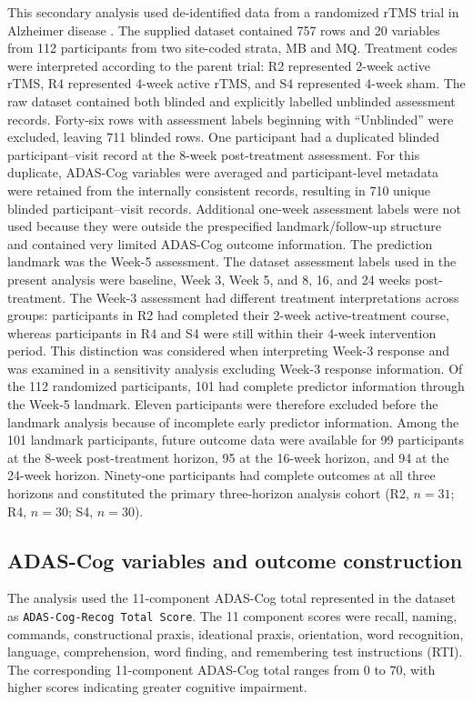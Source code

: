 \documentclass[11pt]{article}
\begin{document}
This secondary analysis used de-identified data from a randomized rTMS trial in Alzheimer disease
\citep{moussavi2021protocol,moussavi2024trial,nct02908815}.
The supplied dataset contained 757 rows and 20 variables from 112 participants from two
site-coded strata, MB and MQ. Treatment codes were interpreted according to the parent trial:
R2 represented 2-week active rTMS, R4 represented 4-week active rTMS, and S4 represented
4-week sham. The raw dataset contained both blinded and explicitly labelled unblinded assessment records.
Forty-six rows with assessment labels beginning with ``Unblinded'' were excluded, leaving
711 blinded rows. One participant had a duplicated blinded participant--visit record at the
8-week post-treatment assessment. For this duplicate, ADAS-Cog variables were averaged and
participant-level metadata were retained from the internally consistent records, resulting in
710 unique blinded participant--visit records. Additional one-week assessment labels were not
used because they were outside the prespecified landmark/follow-up structure and contained very
limited ADAS-Cog outcome information. The prediction landmark was the Week-5 assessment. The dataset assessment labels used in the
present analysis were baseline, Week 3, Week 5, and 8, 16, and 24 weeks post-treatment.
The Week-3 assessment had different treatment interpretations across groups: participants in R2
had completed their 2-week active-treatment course, whereas participants in R4 and S4 were still
within their 4-week intervention period. This distinction was considered when interpreting
Week-3 response and was examined in a sensitivity analysis excluding Week-3 response information.
Of the 112 randomized participants, 101 had complete predictor information through the Week-5
landmark. Eleven participants were therefore excluded before the landmark analysis because of
incomplete early predictor information. Among the 101 landmark participants, future outcome
data were available for 99 participants at the 8-week post-treatment horizon, 95 at the
16-week horizon, and 94 at the 24-week horizon. Ninety-one participants had complete outcomes
at all three horizons and constituted the primary three-horizon analysis cohort
(R2, $n=31$; R4, $n=30$; S4, $n=30$).


\subsection{ADAS-Cog variables and outcome construction}

The analysis used the 11-component ADAS-Cog total represented in the dataset as
\texttt{ADAS-Cog-Recog Total Score}. The 11 component scores were recall, naming,
commands, constructional praxis, ideational praxis, orientation, word recognition,
language, comprehension, word finding, and remembering test instructions (RTI).
The corresponding 11-component ADAS-Cog total ranges from 0 to 70, with higher scores
indicating greater cognitive impairment.
\end{document}
